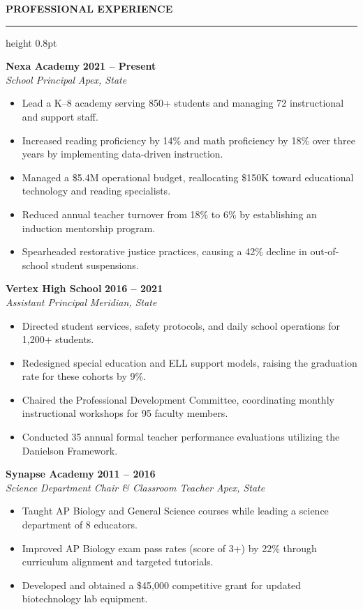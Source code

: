 \documentclass[10pt]{article}
\newcommand{\resumesection}[1]{%
  \vspace{5pt}
  {\color{primary}\bfseries\large\MakeUppercase{#1}}
  \vspace{2pt}
  \hrule height 0.8pt
  \vspace{4pt}
}
\begin{document}
\resumesection{Professional Experience}

\noindent
\textbf{Nexa Academy} \hfill \textbf{2021 -- Present} \\
\textit{School Principal} \hfill \textit{Apex, State}
\begin{itemize}[leftmargin=12pt, topsep=1pt, itemsep=1pt, parsep=0pt]
  \item Lead a K--8 academy serving 850+ students and managing 72 instructional and support staff.
  \item Increased reading proficiency by 14\% and math proficiency by 18\% over three years by implementing data-driven instruction.
  \item Managed a \$5.4M operational budget, reallocating \$150K toward educational technology and reading specialists.
  \item Reduced annual teacher turnover from 18\% to 6\% by establishing an induction mentorship program.
  \item Spearheaded restorative justice practices, causing a 42\% decline in out-of-school student suspensions.
\end{itemize}

\vspace{4pt}
\noindent
\textbf{Vertex High School} \hfill \textbf{2016 -- 2021} \\
\textit{Assistant Principal} \hfill \textit{Meridian, State}
\begin{itemize}[leftmargin=12pt, topsep=1pt, itemsep=1pt, parsep=0pt]
  \item Directed student services, safety protocols, and daily school operations for 1,200+ students.
  \item Redesigned special education and ELL support models, raising the graduation rate for these cohorts by 9\%.
  \item Chaired the Professional Development Committee, coordinating monthly instructional workshops for 95 faculty members.
  \item Conducted 35 annual formal teacher performance evaluations utilizing the Danielson Framework.
\end{itemize}

\vspace{4pt}
\noindent
\textbf{Synapse Academy} \hfill \textbf{2011 -- 2016} \\
\textit{Science Department Chair \& Classroom Teacher} \hfill \textit{Apex, State}
\begin{itemize}[leftmargin=12pt, topsep=1pt, itemsep=1pt, parsep=0pt]
  \item Taught AP Biology and General Science courses while leading a science department of 8 educators.
  \item Improved AP Biology exam pass rates (score of 3+) by 22\% through curriculum alignment and targeted tutorials.
  \item Developed and obtained a \$45,000 competitive grant for updated biotechnology lab equipment.
\end{itemize}
\end{document}
